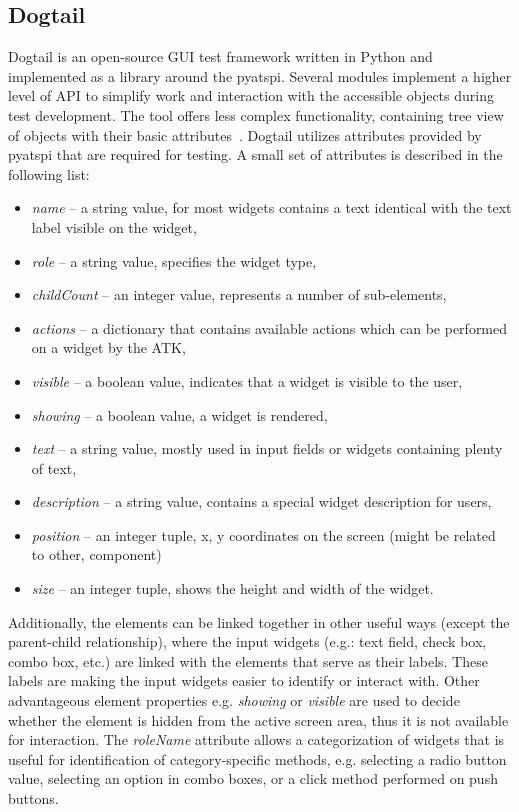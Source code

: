 \subsection{Dogtail}\label{sniff_accerciser}
Dogtail is an open-source GUI test framework written in Python and implemented as a library around the pyatspi. Several modules implement a higher level of API to simplify work and interaction with the accessible objects during test development. The tool offers less complex functionality, containing tree view of objects with their basic attributes~\cite{dogtail_doc}. Dogtail utilizes attributes provided by pyatspi that are required for testing. A small set of attributes is described in the following list:
\begin{itemize}
    \item \textit{name} -- a string value, for most widgets contains a text identical with the text label visible on the widget,
    \item \textit{role} -- a string value, specifies the widget type,
    \item \textit{childCount} -- an integer value, represents a number of sub-elements,
    \item \textit{actions} -- a dictionary that contains available actions which can be performed on a widget by the ATK,
    \item \textit{visible} -- a boolean value, indicates that a widget is visible to the user,
    \item \textit{showing} -- a boolean value, a widget is rendered,
    \item \textit{text} -- a string value, mostly used in input fields or widgets containing plenty of text,
    \item \textit{description} -- a string value, contains a special widget description for users,
    \item \textit{position} -- an integer tuple, x, y coordinates on the screen (might be related to other, component)
    \item \textit{size} -- an integer tuple, shows the height and width of the widget.
\end{itemize}

Additionally, the elements can be linked together in other useful ways (except the parent-child relationship), where the input widgets (e.g.: text field, check box, combo box, etc.) are linked with the elements that serve as their labels. These labels are making the input widgets easier to identify or interact with. Other advantageous element properties e.g. \textit{showing} or \textit{visible} are used to decide whether the element is hidden from the active screen area, thus it is not available for interaction. The \textit{roleName} attribute allows a categorization of widgets that is useful for identification of category-specific methods, e.g. selecting a radio button value, selecting an option in combo boxes, or a click method performed on push buttons. 

